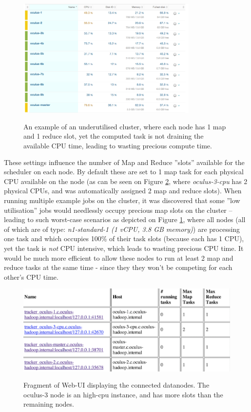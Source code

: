 \begin{figure}[ch!]
  \centering
  \includegraphics[width=0.8\textwidth]{img/hadoop/10nodes-newrelic-suffering-from-no-data-locallity}
  \label{fig:ten-under-utilised-cluster}
  \caption{An example of an underutilised cluster, where each node has 1 map and 1 reduce slot, yet the computed task is not draining the available CPU time, leading to wasting precious compute time.}
\end{figure}

These settings influence the number of Map and Reduce ''slots'' available for the scheduler on each node. By default these are set to 1 map task for each physical CPU available on the node (as can be seen on Figure \ref{fig:four-nodes-config}, where \textit{oculus-3-cpu} has 2 physical CPUs, and was automatically assigned 2 map and reduce slots). When running multiple example jobs on the cluster, it was discovered that some ''low utilisation'' jobs would needlessly occupy precious map slots on the cluster -- leading to such worst-case scenarios as depicted on Figure \ref{fig:ten-under-utilised-cluster}, where all nodes (all of which are of type: \textit{n1-standard-1 (1 vCPU, 3.8 GB memory)}) are processing one task and which occupies 100\% of their task slots (because each has 1 CPU), yet the task is \textit{not} CPU intensive, which leads to wasting precious CPU time. It would be much more efficient to allow these nodes to run at least 2 map and reduce tasks at the same time - since they they won't be competing for each other's CPU time.

\begin{figure}[ch!]
  \centering
  \includegraphics[width=\textwidth]{img/hadoop/4node-cluster-config}
  \label{fig:four-nodes-config}
  \caption{Fragment of Web-UI displaying the connected datanodes. The oculus-3 node is an high-cpu instance, and has more slots than the remaining nodes.}
\end{figure}

